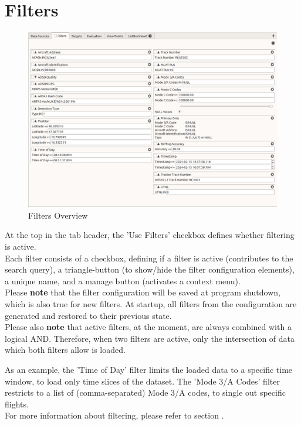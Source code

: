 \section{Filters}
\label{sec:ui_filters}

\begin{figure}[H]
    \hspace*{-2.5cm}
    \includegraphics[width=19cm,frame]{figures/ui_filters.png}
  \caption{Filters Overview}
\end{figure}

At the top in the tab header, the 'Use Filters' checkbox defines whether filtering is active. \\

Each filter consists of a checkbox, defining if a filter is active (contributes to the search query), a triangle-button (to show/hide the filter configuration elements), a unique name, and a manage button (activates a context menu). \\

Please \textbf{note} that the filter configuration will be saved at program shutdown, which is also true for new filters. At startup,  all filters from the configuration are generated and restored to their previous state. \\

Please also \textbf{note} that active filters, at the moment, are always combined with a logical AND. Therefore, when two filters  are active, only the intersection of data which both filters allow is loaded.

As an example, the 'Time of Day' filter limits the loaded data to a specific time window, to load only time slices of the dataset.  The 'Mode 3/A Codes' filter restricts to a list of (comma-separated) Mode 3/A codes, to single out specific flights. \\

For more information about filtering, please refer to section .
 
